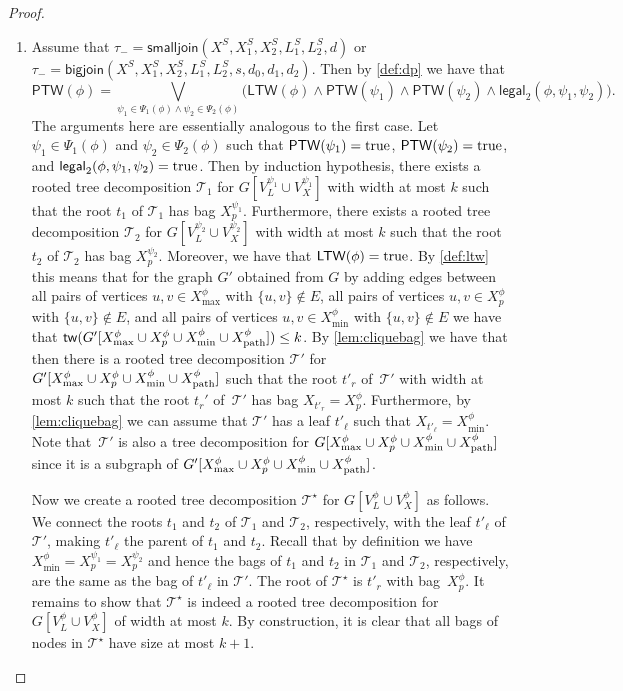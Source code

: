 \documentclass[a4paper,UKenglish,cleveref, autoref, thm-restate, numberwithinsect]{lipics-v2021}
\newcommand{\tw}{\mathsf{tw}}
\newcommand{\bigjoin}{\mathsf{bigjoin}}
\newcommand{\smalljoin}{\mathsf{smalljoin}}
\newcommand{\ptw}{\mathsf{PTW}}
\newcommand{\ltw}{\mathsf{LTW}}
\newcommand{\legal}{\mathsf{legal}}
\newcommand{\dpath}{\textup{path}}
\newcommand{\true}{\textup{true}}
\begin{document}
\begin{proof}
\begin{enumerate}
\item Assume that $\tau_-=\smalljoin(X^S,X_1^S,X_2^S,L_{1}^S, L_{2}^S,d)$ or $\tau_-=\bigjoin(X^S,X_1^S,X_2^S,L_{1}^S, L_{2}^S,s,d_0,d_1,d_2)$. 
Then by \cref{def:dp} we have that 
        \[
        \ptw(\phi) = \bigvee_{\psi_1\in\Psi_1(\phi)\wedge\psi_2\in\Psi_2(\phi)} \bigl(\ltw(\phi)\wedge\ptw(\psi_1)\wedge\ptw(\psi_2)\wedge \legal_2(\phi,\psi_1,\psi_2)\bigr).
        \]
The arguments here are essentially analogous to the first case.
Let $\psi_1\in\Psi_1(\phi)$ and $\psi_2\in\Psi_2(\phi)$ such that $\ptw(\psi_1)=\true$, $\ptw(\psi_2)=\true$, and $\legal_2(\phi,\psi_1,\psi_2)=\true$. 
Then by induction hypothesis, there exists a rooted tree decomposition $\mathcal{T}_1$ for $G[V^{\psi_1}_L\cup V^{\psi_1}_X]$ with width at most $k$ such that the root $t_1$ of $\mathcal{T}_1$ has bag $X^{\psi_1}_p$.
Furthermore, there exists a rooted tree decomposition $\mathcal{T}_2$ for $G[V^{\psi_2}_L\cup V^{\psi_2}_X]$ with width at most $k$ such that the root $t_2$ of $\mathcal{T}_2$ has bag $X^{\psi_2}_p$. 
Moreover, we have that $\ltw(\phi)=\true$. 
By \cref{def:ltw} this means that for the graph $G'$ obtained from $G$ by adding edges between all pairs of vertices $u,v\in  X^\phi_{\max}$ with $\{u,v\}\notin E$,  all pairs of vertices $u,v\in  X^\phi_p$ with $\{u,v\}\notin E$, and all pairs of vertices $u,v\in X^\phi_{\min}$ with $\{u,v\}\notin E$ we have that $\tw(G'[X^\phi_{\max}\cup X^\phi_p\cup X^\phi_{\min}\cup X^\phi_{\dpath}])\le k$.
By \cref{lem:cliquebag} we have that then there is a rooted tree decomposition $\mathcal{T}'$ for $G'[X^\phi_{\max}\cup X^\phi_p\cup X^\phi_{\min}\cup X^\phi_{\dpath}]$ such that the root $t'_r$ of~$\mathcal{T}'$ with width at most $k$ such that the root $t_r'$ of~$\mathcal{T}'$ has bag $X_{t'_r}=X^\phi_p$.
Furthermore, by \cref{lem:cliquebag} we can assume that $\mathcal{T}'$ has a leaf $t'_\ell$ such that $X_{t'_\ell}=X^\phi_{\min}$.
Note that~$\mathcal{T}'$ is also a tree decomposition for $G[X^\phi_{\max}\cup X^\phi_p\cup X^\phi_{\min}\cup X^\phi_{\dpath}]$ since it is a subgraph of $G'[X^\phi_{\max}\cup X^\phi_p\cup X^\phi_{\min}\cup X^\phi_{\dpath}]$. 

Now we create a rooted tree decomposition $\mathcal{T}^\star$ for $G[V^\phi_L\cup V^\phi_X]$ as follows. 
We connect the roots $t_1$ and $t_2$ of $\mathcal{T}_1$ and $\mathcal{T}_2$, respectively, with the leaf $t'_\ell$ of $\mathcal{T}'$, making $t'_\ell$ the parent of $t_1$ and $t_2$. Recall that by definition we have $X^\phi_{\min}=X^{\psi_1}_p=X^{\psi_2}_p$ and hence the bags of $t_1$ and $t_2$ in $\mathcal{T}_1$ and $\mathcal{T}_2$, respectively, are the same as the bag of $t'_\ell$ in $\mathcal{T}'$. The root of $\mathcal{T}^\star$ is $t'_r$ with bag~$X^\phi_p$.
It remains to show that $\mathcal{T}^\star$ is indeed a rooted tree decomposition for $G[V^\phi_L\cup V^\phi_X]$ of width at most $k$. By construction, it is clear that all bags of nodes in $\mathcal{T}^\star$ have size at most $k+1$. 


\end{enumerate}
\end{proof}
\end{document}
